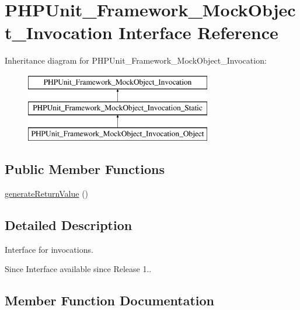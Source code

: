 \hypertarget{interface_p_h_p_unit___framework___mock_object___invocation}{}\section{P\+H\+P\+Unit\+\_\+\+Framework\+\_\+\+Mock\+Object\+\_\+\+Invocation Interface Reference}
\label{interface_p_h_p_unit___framework___mock_object___invocation}
Inheritance diagram for P\+H\+P\+Unit\+\_\+\+Framework\+\_\+\+Mock\+Object\+\_\+\+Invocation\+:\begin{figure}[H]
\begin{center}
\leavevmode
\includegraphics[height=3.000000cm]{interface_p_h_p_unit___framework___mock_object___invocation}
\end{center}
\end{figure}
\subsection*{Public Member Functions}
\begin{DoxyCompactItemize}
\item 
\mbox{\hyperlink{interface_p_h_p_unit___framework___mock_object___invocation_af64f7ab3f0f61dbcf7e63601099137d1}{generate\+Return\+Value}} ()
\end{DoxyCompactItemize}


\subsection{Detailed Description}
Interface for invocations.

\begin{DoxySince}{Since}
Interface available since Release 1.. 
\end{DoxySince}


\subsection{Member Function Documentation}
\mbox{\label{interface_p_h_p_unit___framework___mock_object___invocation_af64f7ab3f0f61dbcf7e63601099137d1}} 
